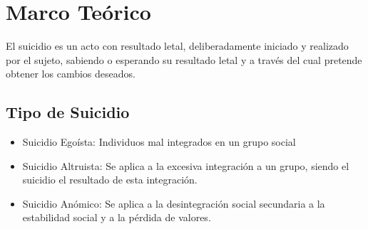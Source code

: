 \section{Marco Teórico}
{
El suicidio es un acto con resultado letal, deliberadamente iniciado y realizado por el sujeto, sabiendo o esperando su resultado letal y a través del cual pretende obtener los cambios deseados.
\subsection{Tipo de Suicidio}
{
\begin{itemize}
\item Suicidio Egoísta: Individuos mal integrados en un grupo social
\item Suicidio Altruista: Se aplica a la excesiva integración a un grupo, siendo el suicidio el resultado de esta integración.
\item Suicidio Anómico: Se aplica a la desintegración social secundaria a la estabilidad social y a la pérdida de valores.
\end{itemize}
}
}
